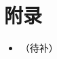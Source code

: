 \documentclass{article}
\begin{document}
\maketitle

\begin{abstract}
\end{abstract}

\thispagestyle{empty} %

\newpage
\tableofcontents

\newpage

\begin{markdown}
\end{markdown}

\newpage
\section{附录}

\appendix


\begin{itemize}
    \item （待补）
\end{itemize}

\end{document}
